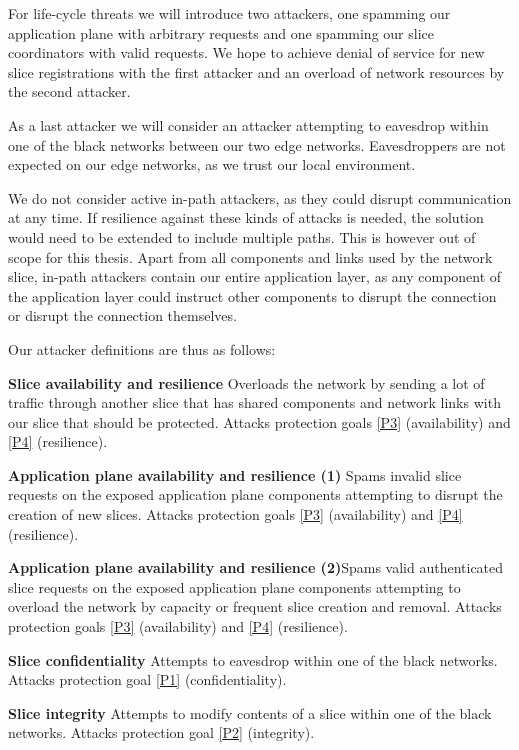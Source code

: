 For life-cycle threats we will introduce two attackers, one spamming our application plane with arbitrary requests and one spamming our slice coordinators with valid requests. We hope to achieve denial of service for new slice registrations with the first attacker and an overload of network resources by the second attacker.

As a last attacker we will consider an attacker attempting to eavesdrop within one of the black networks between our two edge networks. Eavesdroppers are not expected on our edge networks, as we trust our local environment.

We do not consider active in-path attackers, as they could disrupt communication at any time. If resilience against these kinds of attacks is needed, the solution would need to be extended to include multiple paths. This is however out of scope for this thesis. Apart from all components and links used by the network slice, in-path attackers contain our entire application layer, as any component of the application layer could instruct other components to disrupt the connection or disrupt the connection themselves.

Our attacker definitions are thus as follows:
\begin{description}[style=multiline, labelwidth=0.7cm]
    \item[\namedlabel{A1}{A1}] \textbf{Slice availability and resilience} Overloads the network by sending a lot of traffic through another slice that has shared components and network links with our slice that should be protected. Attacks protection goals \ref{P3} (availability) and \ref{P4} (resilience).
    \item[\namedlabel{A2}{A2}] \textbf{Application plane availability and resilience (1)} Spams invalid slice requests on the exposed application plane components attempting to disrupt the creation of new slices. Attacks protection goals \ref{P3} (availability) and \ref{P4} (resilience).
    \item[\namedlabel{A3}{A3}] \textbf{Application plane availability and resilience (2)}Spams valid authenticated slice requests on the exposed application plane components attempting to overload the network by capacity or frequent slice creation and removal. Attacks protection goals \ref{P3} (availability) and \ref{P4} (resilience).
    \item[\namedlabel{A4}{A4}] \textbf{Slice confidentiality} Attempts to eavesdrop within one of the black networks. Attacks protection goal \ref{P1} (confidentiality).
    \item[\namedlabel{A5}{A5}] \textbf{Slice integrity} Attempts to modify contents of a slice within one of the black networks. Attacks protection goal \ref{P2} (integrity).
\end{description}

